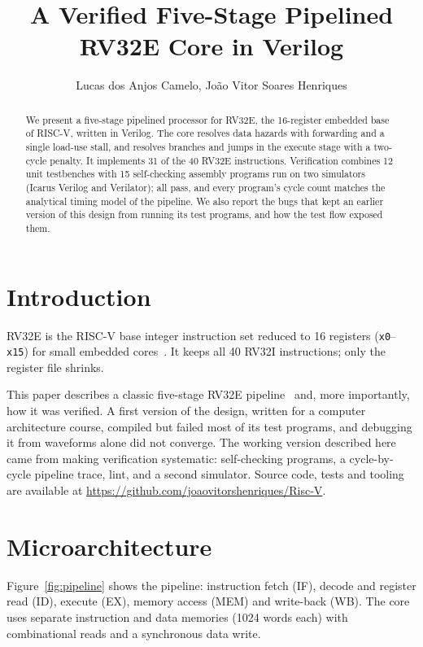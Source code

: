 \documentclass[12pt]{article}
\title{A Verified Five-Stage Pipelined RV32E Core in Verilog}
\author{Lucas dos Anjos Camelo, João Vitor Soares Henriques}
\begin{document}
\maketitle

\begin{abstract}
We present a five-stage pipelined processor for RV32E, the 16-register embedded
base of RISC-V, written in Verilog. The core resolves data hazards with
forwarding and a single load-use stall, and resolves branches and jumps in the
execute stage with a two-cycle penalty. It implements 31 of the 40 RV32E
instructions. Verification combines 12 unit testbenches with 15 self-checking
assembly programs run on two simulators (Icarus Verilog and Verilator); all
pass, and every program's cycle count matches the analytical timing model of
the pipeline. We also report the bugs that kept an earlier version of this
design from running its test programs, and how the test flow exposed them.
\end{abstract}

\section{Introduction}

RV32E is the RISC-V base integer instruction set reduced to 16 registers
(\texttt{x0}--\texttt{x15}) for small embedded cores~\cite{riscv-spec}. It keeps
all 40 RV32I instructions; only the register file shrinks.

This paper describes a classic five-stage RV32E pipeline~\cite{patterson} and,
more importantly, how it was verified. A first version of the design, written
for a computer architecture course, compiled but failed most of its test
programs, and debugging it from waveforms alone did not converge. The working
version described here came from making verification systematic: self-checking
programs, a cycle-by-cycle pipeline trace, lint, and a second simulator.
Source code, tests and tooling are available at
\url{https://github.com/joaovitorshenriques/Risc-V}.

\section{Microarchitecture}

Figure~\ref{fig:pipeline} shows the pipeline: instruction fetch (IF), decode and
register read (ID), execute (EX), memory access (MEM) and write-back (WB). The
core uses separate instruction and data memories (1024 words each) with
combinational reads and a synchronous data write.
\end{document}

